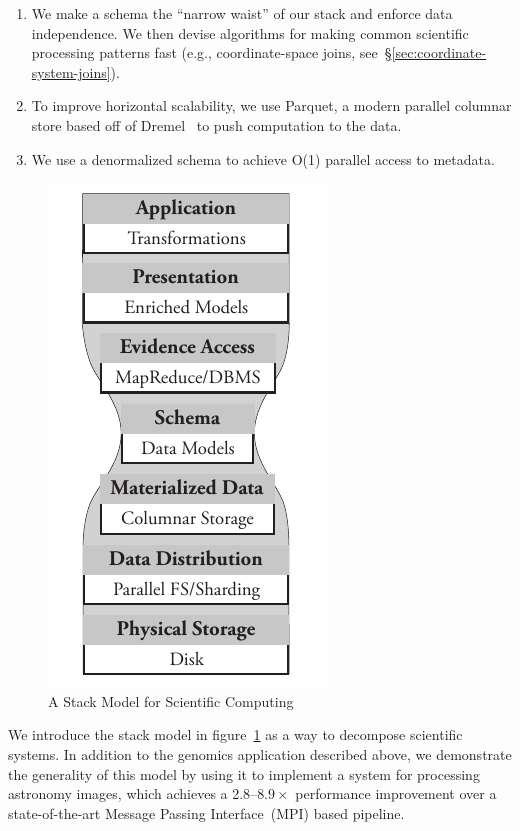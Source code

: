 \documentclass{acm_proc_article-sp}
\begin{document}
\begin{enumerate}
\item We make a schema the ``narrow waist'' of our stack and enforce data independence. We then
devise algorithms for making common scientific processing patterns fast (e.g., coordinate-space joins,
see~\S\ref{sec:coordinate-system-joins}).
\item To improve horizontal scalability, we use Parquet, a modern parallel columnar store based off of
Dremel~\cite{melnik10} to push computation to the data.
\item We use a denormalized schema to achieve O(1) parallel access to metadata.
\end{enumerate}

\begin{figure}[h]
\begin{center}
\includegraphics[width=0.6\linewidth]{stack-model.pdf}
\end{center}
\caption{A Stack Model for Scientific Computing}
\label{fig:stack-model}
\end{figure}

We introduce the stack model in figure~\ref{fig:stack-model} as a way to decompose scientific systems. In
addition to the genomics application described above, we demonstrate the generality of this model by using it to
implement a system for processing astronomy images, which achieves a 2.8--$8.9\times$ performance
improvement over a state-of-the-art Message Passing Interface~(MPI) based pipeline.
\end{document}
